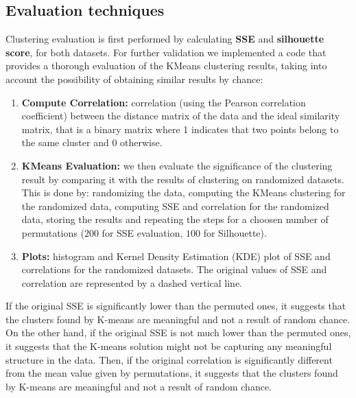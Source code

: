 \subsection{Evaluation techniques}
Clustering evaluation is first performed by calculating \textbf{SSE} and \textbf{silhouette score}, for both datasets. For further validation we implemented a code that provides a thorough evaluation of the KMeans clustering results, taking into account the possibility of obtaining similar results by chance:
\begin{enumerate}
\item \textbf{Compute Correlation:} correlation (using the Pearson correlation coefficient) between the distance matrix of the data and the ideal similarity matrix, that is a binary matrix where 1 indicates that two points belong to the same cluster and 0 otherwise. 
\item \textbf{KMeans Evaluation:} we then evaluate the significance of the clustering result by comparing it with the results of clustering on randomized datasets. This is done by: randomizing the data, computing the KMeans clustering for the randomized data, computing SSE and correlation for the randomized data, storing the results and repeating the steps for a choosen number of permutations ($200$ for SSE evaluation, $100$ for Silhouette).
\item \textbf{Plots:} histogram and Kernel Density Estimation (KDE) plot of SSE and correlations for the randomized datasets. The original values of SSE and correlation are represented by a dashed vertical line. 
\end{enumerate}
If the original SSE is significantly lower than the permuted ones, it suggests that the clusters found by K-means are meaningful and not a result of random chance. On the other hand, if the original SSE is not much lower than the permuted ones, it suggests that the K-means solution might not be capturing any meaningful structure in the data. Then, if the original correlation is significantly different from the mean value given by permutations, it suggests that the clusters found by K-means are meaningful and not a result of random chance.


